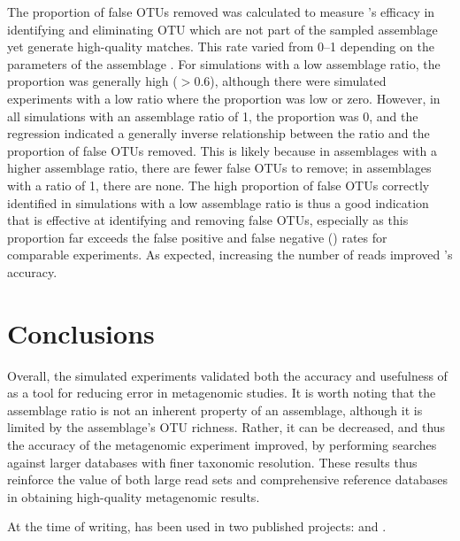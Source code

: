 The proportion of false \acp{OTU} removed was calculated to measure 's efficacy in identifying and eliminating \ac{OTU} which are not part of the sampled assemblage yet generate high-quality  matches.
This rate varied from 0--1 depending on the parameters of the assemblage .
For simulations with a low assemblage ratio, the proportion was generally high ($> 0.6$), although there were simulated experiments with a low ratio where the proportion was low or zero.
However, in all simulations with an assemblage ratio of 1, the proportion was 0, and the regression indicated a generally inverse relationship between the ratio and the proportion of false \acp{OTU} removed.
This is likely because in assemblages with a higher assemblage ratio, there are fewer false \acp{OTU} to remove; in assemblages with a ratio of 1, there are none.
The high proportion of false \acp{OTU} correctly identified in simulations with a low assemblage ratio is thus a good indication that  is effective at identifying and removing false \acp{OTU}, especially as this proportion far exceeds the false positive and false negative () rates for comparable experiments.
As expected, increasing the number of reads improved 's accuracy.

\section{Conclusions}

Overall, the simulated experiments validated both the accuracy and usefulness of  as a tool for reducing error in metagenomic studies.
It is worth noting that the assemblage ratio is not an inherent property of an assemblage, although it is limited by the assemblage's \ac{OTU} richness.
Rather, it can be decreased, and thus the accuracy of the metagenomic experiment improved, by performing  searches against larger databases with finer taxonomic resolution.
These results thus reinforce the value of both large read sets and comprehensive reference databases in obtaining high-quality metagenomic results.

At the time of writing,  has been used in two published projects: \citet{Wilkins:2012wg} and \citet{Williams:2012gsa}.
